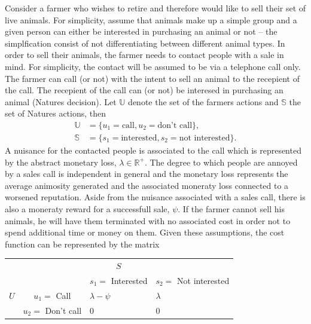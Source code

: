 \begin{example}
	Consider a farmer who wishes to retire and therefore would like to sell their set of live animals. For simplicity, assume that animals make up a simple group and a given person can either be interested in purchasing an animal or not -- the simplfication consist of not differentiating between different animal types. In order to sell their animals, the farmer needs to contact people with a sale in mind. For simplicity, the contact will be assumed to be via a telephone call only. The farmer can call (or not) with the intent to sell an animal to the recepient of the call. The recepient of the call can (or not) be interesed in purchasing an animal (Natures decision). Let $\mathbb{U}$ denote the set of the farmers actions and $\mathbb{S}$ the set of Natures actions, then
	\begin{equation}
		\begin{split}
			\mathbb{U} &= \{u_1 = \text{call}, u_2 = \text{don't call}\},\\
			\mathbb{S} &= \{s_1 = \text{interested}, s_2 = \text{not interested}\}.
		\end{split}
	\end{equation}
	A nuisance for the contacted people is associated to the call which is represented by the abstract monetary loss, $\lambda\in \mathbb{R}^+$. The degree to which people are annoyed by a sales call is independent in general and the monetary loss represents the average animosity generated and the associated moneraty loss connected to a worsened reputation. Aside from the nuisance associated with a sales call, there is also a moneraty reward for a successfull sale, $\psi$.	If the farmer cannot sell his animals, he will have them terminated with no associated cost in order not to spend additional time or money on them. Given these assumptions, the cost function can be represented by the matrix
	\begin{center}
		\begin{tabular}{ c  c  c  c }
			&& $S$& \\
			&& $s_1=$ Interested & $s_2=$ Not interested  \\
			\cline{3-4}
			$U$ & $u_1 =$ Call& \multicolumn{1}{|l}{$\lambda-\psi$} &\multicolumn{1}{l|}{$\lambda$}  \\
			& $u_2=$ Don't call& \multicolumn{1}{|l}{$0$} & \multicolumn{1}{l|}{0} \\
			\cline{3-4}
		\end{tabular}
	\end{center}

\end{example}
